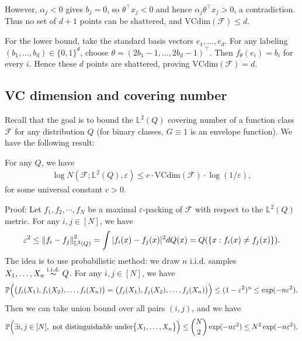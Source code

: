 \documentclass[11pt,letterpaper]{article}
\numberwithin{theorem}{lecture}
\numberwithin{proposition}{lecture}
\numberwithin{lemma}{lecture}
\numberwithin{claim}{lecture}
\numberwithin{corollary}{lecture}
\numberwithin{definition}{lecture}
\numberwithin{conjecture}{lecture}
\numberwithin{remark}{lecture}
\numberwithin{example}{lecture}
\numberwithin{equation}{lecture}
\begin{document}
However, $\alpha_j < 0$ gives $b_j = 0$, so $\theta^\top x_j < 0$ and hence $\alpha_j \theta^\top x_j > 0$, a contradiction. Thus no set of $d + 1$ points can be shattered, and $\text{VCdim} (\mathcal{F}) \leq d$.

For the lower bound, take the standard basis vectors $e_1, \ldots, e_d$. For any labeling $(b_1, \ldots, b_d) \in \{0, 1\}^d$, choose $\theta = (2b_1 - 1, \ldots, 2b_d - 1)^\top$. Then $f_\theta (e_i) = b_i$ for every $i$. Hence these $d$ points are shattered, proving $\text{VCdim} (\mathcal{F}) = d$.

\subsection{VC dimension and covering number}
Recall that the goal is to bound the $\mathbb{L}^2 (Q)$ covering number of a function class $\mathcal{F}$ for any distribution $Q$ (for binary classes, $G \equiv 1$ is an envelope function). We have the following result:
\begin{theorem}
  For any $Q$, we have
  \begin{align*}
    \log N (\mathcal{F}; \mathbb{L}^2 (Q), \varepsilon) \leq c \cdot \text{VCdim} (\mathcal{F}) \cdot \log (1/\varepsilon),
  \end{align*}
  for some universal constant $c > 0$.
\end{theorem}
Proof: Let $f_1, f_2, \cdots, f_N$ be a maximal $\varepsilon$-packing of $\mathcal{F}$ with respect to the $\mathbb{L}^2 (Q)$ metric. For any $i, j \in [N]$, we have
\begin{align*}
  \varepsilon^2 \leq \left\| f_i - f_j\right\|_{\mathbb{L}^2 (Q)}^2 = \int |f_i (x) - f_j (x)|^2 d Q(x) = Q (\{x: f_i (x) \neq f_j (x)\}).
\end{align*}
The idea is to use probabilistic method: we draw $n$ i.i.d. samples $X_1, \ldots, X_n \overset{\mathrm{i.i.d.}}{\sim} Q$. For any $i, j \in [N]$, we have
\begin{align*}
  {\mathbb{P}} \Big( \big( f_i(X_1), f_i (X_2), \ldots, f_i (X_n) \big) = \big( f_j(X_1), f_j (X_2), \ldots, f_j (X_n) \big) \Big) \leq (1 - \varepsilon^2)^n \leq \exp (- n \varepsilon^2).
\end{align*}
Then we can take union bound over all pairs $(i, j)$, and we have
\begin{align*}
  {\mathbb{P}} \Big( \exists i, j \in [N], \text{ not distinguishable under} \big\{X_1, \ldots, X_n\big\} \Big) \leq \binom{N}{2} \exp (- n \varepsilon^2) \leq N^2 \exp (- n \varepsilon^2).
\end{align*}
\end{document}
